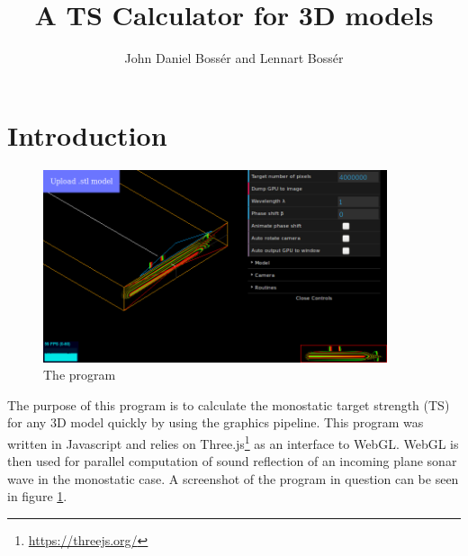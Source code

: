 \documentclass[a4paper, 11pt]{article}
\title{A TS Calculator for 3D models}
\author{John Daniel Bossér and Lennart Bossér}
\begin{document}

\maketitle

\section{Introduction}

    \begin{figure}
        \centering
        \includegraphics[width=0.9\textwidth]{figures/screenshot.png}     
        \caption{The program}
        \label{fig:screenshot}
    \end{figure}

    The purpose of this program is to calculate the monostatic target strength (TS) for any 3D model quickly by using the graphics pipeline. This program was written in Javascript and relies on Three.js\footnote{\url{https://threejs.org/}} as an interface to WebGL. WebGL is then used for parallel computation of sound reflection of an incoming plane sonar wave in the monostatic case. A screenshot of the program in question can be seen in figure \ref{fig:screenshot}.
        
\end{document}
